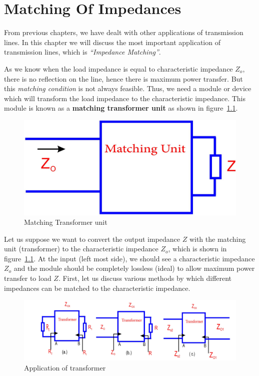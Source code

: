 \chapter{Matching Of Impedances}\label{lec:lec12}
From previous chapters, we have dealt with other applications of transmission lines. In this chapter we will discuss the most important application of transmission lines, which is \emph{\textquotedblleft Impedance Matching\textquotedblright}.

As we know when the load impedance is equal to characteristic impedance $Z_o$, there is no reflection on the line, hence there is maximum power transfer. But this \textit{matching condition} is not always feasible. Thus, we need a module or device which will transform the load impedance to the characteristic impedance. This module is known as a \textbf{matching transformer unit} as shown in figure~\ref{fig:fig7}.
\begin{figure}[h]
\centering
\includegraphics[width=1\linewidth]{./graphics/fig7}
\caption{Matching Transformer unit}
\label{fig:fig7}
\end{figure} 

Let us suppose we want to convert the output impedance $Z$ with the matching unit (transformer) to the characteristic impedance $Z_o$, which is shown in figure~\ref{fig:fig7}. At the input (left most side), we should see a characteristic impedance $ Z_o$ and the module should be completely lossless (ideal) to allow maximum power transfer to load $Z$. First, let us discuss various methods by which different impedances can be matched to the characteristic impedance.
\begin{figure}[h]
\centering
\includegraphics[width=0.7\linewidth]{./graphics/fig8}
\caption{Application of transformer}
\label{fig:fig8}
\end{figure}

